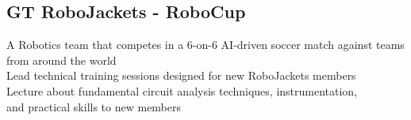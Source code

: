 \documentclass[]{deedy-resume-openfont}
\begin{document}
\begin{minipage}[t]{0.33\textwidth}
		\subsection{GT RoboJackets - RoboCup}
		\textbullet{} A Robotics team that competes in a 6-on-6 AI-driven soccer match against teams from around the world \\
		\textbullet{} Lead technical training sessions designed for new RoboJackets members \\
		\textbullet{} Lecture about fundamental circuit analysis techniques, instrumentation, \\
		and practical skills to new members 
		
		\sectionsep
		
		
	\end{minipage} 
	\hfill
\end{document}
